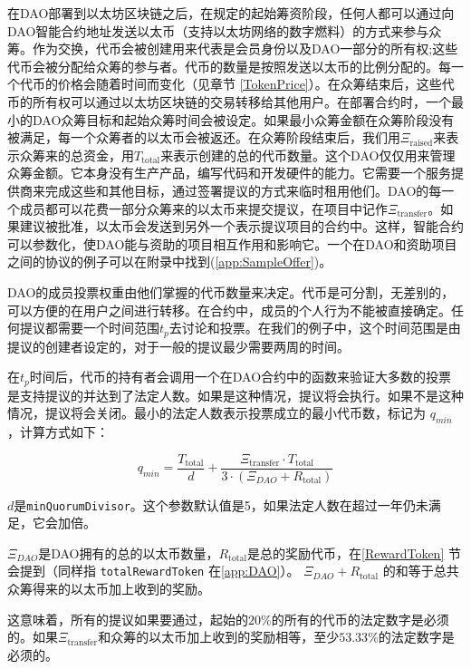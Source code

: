\documentclass[9pt,oneside]{amsart}
\begin{document}
\begin{multicols}{2}
在DAO部署到以太坊区块链之后，在规定的起始筹资阶段，任何人都可以通过向DAO智能合约地址发送以太币（支持以太坊网络的数字燃料）的方式来参与众筹。作为交换，代币会被创建用来代表是会员身份以及DAO一部分的所有权;这些代币会被分配给众筹的参与者。代币的数量是按照发送以太币的比例分配的。每一个代币的价格会随着时间而变化（见章节 \ref{TokenPrice}）。在众筹结束后，这些代币的所有权可以通过以太坊区块链的交易转移给其他用户。在部署合约时，一个最小的DAO众筹目标和起始众筹时间会被设定。如果最小众筹金额在众筹阶段没有被满足，每一个众筹者的以太币会被返还。在众筹阶段结束后，我们用$\Xi_{\text{raised}}$来表示众筹来的总资金，用$T_{\text{total}}$来表示创建的总的代币数量。这个DAO仅仅用来管理众筹金额。它本身没有生产产品，编写代码和开发硬件的能力。它需要一个服务提供商来完成这些和其他目标，通过签署提议的方式来临时租用他们。DAO的每一个成员都可以花费一部分众筹来的以太币来提交提议，在项目中记作$\Xi_{\text{transfer}}$。如果建议被批准，以太币会发送到另外一个表示提议项目的合约中。这样，智能合约可以参数化，使DAO能与资助的项目相互作用和影响它。一个在DAO和资助项目之间的协议的例子可以在附录中找到(\ref{app:SampleOffer})。

DAO的成员投票权重由他们掌握的代币数量来决定。代币是可分割，无差别的，可以方便的在用户之间进行转移。在合约中，成员的个人行为不能被直接确定。任何提议都需要一个时间范围$t_p$去讨论和投票。在我们的例子中，这个时间范围是由提议的创建者设定的，对于一般的提议最少需要两周的时间。

在$t_p$时间后，代币的持有者会调用一个在DAO合约中的函数来验证大多数的投票是支持提议的并达到了法定人数。如果是这种情况，提议将会执行。如果不是这种情况，提议将会关闭。最小的法定人数表示投票成立的最小代币数，标记为 $q_{min}$，计算方式如下：

\begin{equation}
 q_{min} = \frac{T_{\text{total}}}{d} + \frac{\Xi_{\text{transfer}} \cdot T_{\text{total}}}{3 \cdot (\Xi_{DAO} + R_{\text{total}})}
 \label{minQuorum}
\end{equation}

$d$是\verb|minQuorumDivisor|。这个参数默认值是5，如果法定人数在超过一年仍未满足，它会加倍。

$\Xi_{DAO}$是DAO拥有的总的以太币数量，$R_{\text{total}}$是总的奖励代币，在\ref{RewardToken} 节会提到（同样指 \verb|totalRewardToken| 在\ref{app:DAO}）。 $\Xi_{DAO} + R_{\text{total}}$ 的和等于总共众筹得来的以太币加上收到的奖励。

这意味着，所有的提议如果要通过，起始的$20\%$的所有的代币的法定数字是必须的。如果$\Xi_{\text{transfer}}$和众筹的以太币加上收到的奖励相等，至少$53.33\%$的法定数字是必须的。


\end{multicols}
\end{document}
